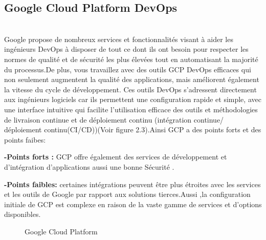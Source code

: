 \subsection{\LARGE Google Cloud Platform DevOps }
\texttt{}\\[0.1cm]
\textsf{\selectfont{}
Google propose de nombreux services et fonctionnalités visant à aider les ingénieurs DevOps à disposer de tout ce dont ils ont besoin pour respecter les normes de qualité et de sécurité les plus élevées tout en automatisant la majorité du processus.De plus, vous travaillez avec des outils GCP DevOps efficaces qui non seulement augmentent la qualité des applications, mais améliorent également la vitesse du cycle de développement. Ces outils DevOps s’adressent directement aux ingénieurs logiciels car ils permettent une configuration rapide et simple, avec une interface intuitive qui facilite l’utilisation efficace des outils et méthodologies de livraison continue et de déploiement continu (intégration continue/ déploiement continu(CI/CD))(Voir figure 2.3).Ainsi GCP a des points forts et des points faibes:\cite{11}}
\par \noindent \textbf{\Large -Points forts :}
\textsf{\selectfont{} GCP offre également des services de développement et d’intégration d’applications aussi une bonne Sécurité .}\\[0.1cm]
\par \noindent \textbf{\Large -Points faibles:}
\textsf{\selectfont{}  certaines intégrations peuvent être plus étroites avec les services et les outils de Google par rapport aux solutions tierces.Aussi ,la  configuration initiale de GCP est complexe en raison de la vaste gamme de services et d'options disponibles.}\\[0.1cm]
\begin{figure}[H]
  \begin{center}
  

  \end{center}
  
  \caption{Google Cloud Platform}
\end{figure}
